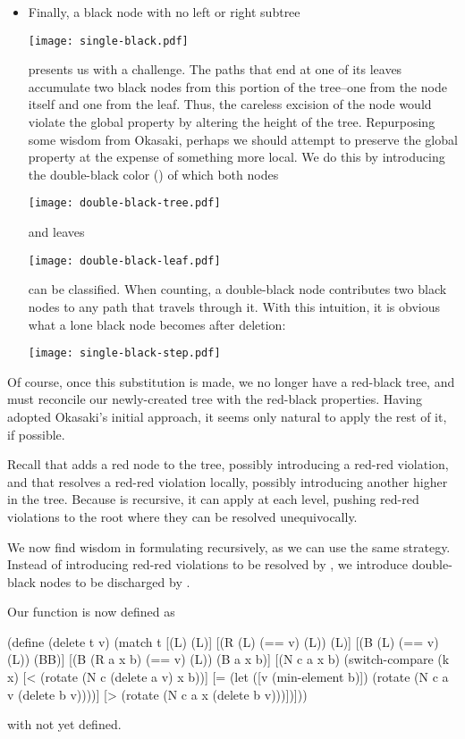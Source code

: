 \documentclass[preprint]{sigplanconf}
\begin{document}
\begin{itemize}
\item Finally, a black node with no left or right subtree
\begin{center}
\texttt{[image: single-black.pdf]}
\end{center}
presents us with a challenge. The paths that end at one of its leaves accumulate two black nodes from this portion of the tree--one from the node itself and one from the leaf. Thus, the careless excision of the node would violate the global property by altering the height of the tree. Repurposing some wisdom from Okasaki, perhaps we should attempt to preserve the global property at the expense of something more local. We do this by introducing the double-black color () of which both nodes
\begin{center}
\texttt{[image: double-black-tree.pdf]}
\end{center}
and leaves
\begin{center}
\texttt{[image: double-black-leaf.pdf]}
\end{center}
can be classified. When counting, a double-black node contributes two black nodes to any path that travels through it. With this intuition, it is obvious what a lone black node becomes after deletion:
\begin{center}
\texttt{[image: single-black-step.pdf]}
\end{center}

\end{itemize}

Of course, once this substitution is made, we no longer have a red-black tree, and must reconcile our newly-created tree with the red-black properties. Having adopted Okasaki's initial approach, it seems only natural to apply the rest of it, if possible.

Recall that  adds a red node to the tree, possibly introducing a red-red violation, and that  resolves a red-red violation locally, possibly introducing another higher in the tree. Because  is recursive, it can apply  at each level, pushing red-red violations to the root where they can be resolved unequivocally.

We now find wisdom in formulating  recursively, as we can use the same strategy. Instead of introducing red-red violations to be resolved by , we introduce double-black nodes to be discharged by .

Our  function is now defined as
\begin{schemedisplay}
(define (delete t v)
  (match t
    [(L) (L)]
    [(R (L) (== v) (L)) (L)]
    [(B (L) (== v) (L)) (BB)]
    [(B (R a x b) (== v) (L)) (B a x b)]
    [(N c a x b)
     (switch-compare
       (k x)
       [< (rotate (N c (delete a v) x b))]
       [= (let ([v (min-element b)])
            (rotate (N c a v (delete b v))))]
       [> (rotate (N c a x (delete b v)))])]))
\end{schemedisplay}
with  not yet defined.
\end{document}
